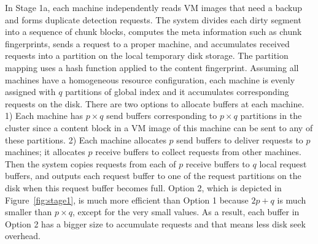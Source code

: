 In Stage 1a, each machine independently reads  
VM images that need a backup
and forms duplicate  detection requests. 
The system divides  each dirty segment into a sequence of chunk blocks,  computes the meta 
information such as chunk fingerprints,  sends a request to a proper machine, and accumulates  
received requests into a partition on the local temporary disk storage. 
The partition mapping uses a hash function applied to the content fingerprint. 
Assuming all machines have a  homogeneous resource configuration, each machine is evenly  assigned with
$q$ partitions of global index and it accumulates corresponding requests on the disk. 
There are two options to allocate buffers at each machine. 
1) Each machine has  $p\times q$ send buffers corresponding to $p\times q$ partitions in the cluster
since a content block in a VM image of this machine can be sent to any of these partitions.
2) Each machine allocates $p$ send buffers to deliver requests to $p$ machines; it allocates 
$p$ receive buffers to collect requests  from other machines.
Then the system copies requests from each of $p$ receive buffers to  $q$ local request buffers,
and outputs each request buffer to one of the request partitions on the disk
when this request buffer becomes full.  Option 2, which is  depicted in Figure~\ref{fig:stage1},
is much more efficient than Option 1 because $2p+q$ is much smaller than
$p\times q$, except for the very small  values. 
As a result, each buffer in Option 2 has a bigger size to accumulate requests and that means
less disk seek overhead.

